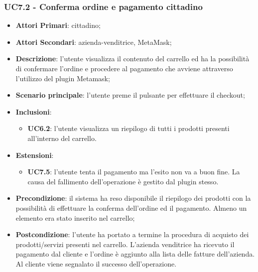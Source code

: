 \subsubsection{UC7.2 - Conferma ordine e pagamento cittadino}
\begin{itemize}
	\item \textbf{Attori Primari}: cittadino;
	\item \textbf{Attori Secondari}: azienda-venditrice, MetaMask\glo;
	\item \textbf{Descrizione}: l'utente visualizza il contenuto del carrello ed ha la possibilità di confermare l'ordine e procedere al pagamento che avviene attraverso l'utilizzo del plugin Metamask\glo;
	\item \textbf{Scenario principale}: l'utente preme il pulsante per effettuare il checkout;
	\item \textbf{Inclusioni}: 
	\begin{itemize}
		\item \textbf{UC6.2}: l'utente visualizza un riepilogo di tutti i prodotti presenti all'interno del carrello.
	\end{itemize}
	\item \textbf{Estensioni}: 
	\begin{itemize}
		\item \textbf{UC7.5}: l'utente tenta il pagamento ma l'esito non va a buon fine. La causa del fallimento dell'operazione è gestito dal plugin stesso.
	\end{itemize}
	\item \textbf{Precondizione}: il sistema ha reso disponibile il riepilogo dei prodotti con la possibilità di effettuare la conferma dell'ordine ed il pagamento. Almeno un elemento era stato inserito nel carrello; 
	\item \textbf{Postcondizione}: l'utente ha portato a termine la procedura di acquisto dei prodotti/servizi presenti nel carrello. L'azienda venditrice ha ricevuto il pagamento dal cliente e l'ordine è aggiunto alla lista delle fatture dell'azienda. Al cliente viene segnalato il successo dell'operazione.
\end{itemize}
